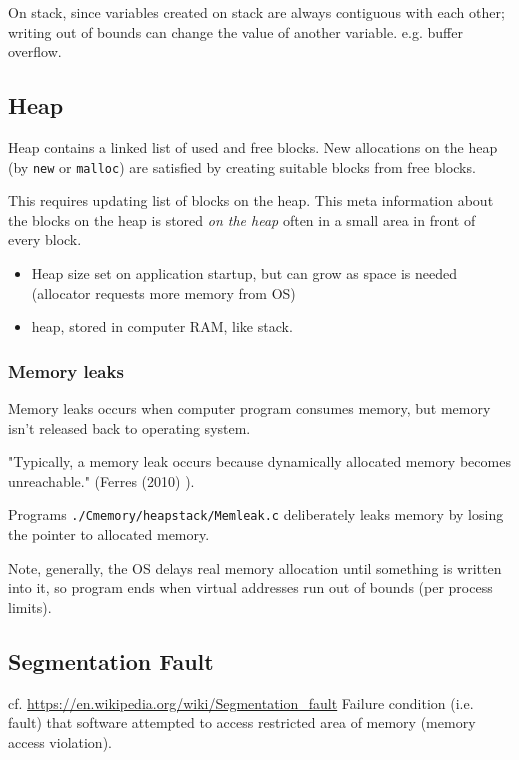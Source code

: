 \documentclass[10pt]{amsart}
\begin{document}
On stack, since variables created on stack are always contiguous with each other; writing out of bounds can change the value of another variable.  e.g. buffer overflow.  


\subsection{Heap}  

Heap contains a linked list of used and free blocks.  New allocations on the heap (by \verb|new| or \verb|malloc|) are satisfied by creating suitable blocks from free blocks.  

This requires updating list of blocks on the heap.  This meta information about the blocks on the heap is stored \emph{on the heap} often in a small area in front of every block.  

\begin{itemize}
	\item Heap size set on application startup, but can grow as space is needed (allocator requests more memory from OS)
	\item heap, stored in computer RAM, like stack.
\end{itemize}

\subsubsection{Memory leaks}  

Memory leaks occurs when computer program consumes memory, but memory isn't released back to operating system.  

"Typically, a memory leak occurs because dynamically allocated memory becomes unreachable."  (Ferres (2010) \cite{Ferr2010}).  

Programs \verb|./Cmemory/heapstack/Memleak.c| deliberately leaks memory by losing the pointer to allocated memory.  

Note, generally, the OS delays real memory allocation until something is written into it, so program ends when virtual addresses run out of bounds (per process limits).  

\subsection{Segmentation Fault}
cf. \url{https://en.wikipedia.org/wiki/Segmentation_fault}
Failure condition (i.e. fault) that software attempted to access restricted area of memory (memory access violation).
\end{document}
